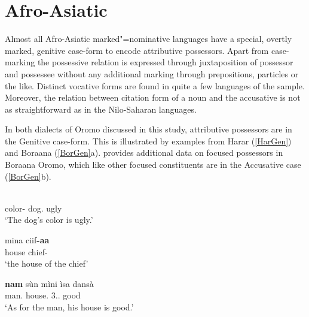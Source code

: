 \section{Afro-Asiatic}\label{ExtraAfro}

Almost all Afro-Asiatic marked"=nominative languages have a special, overtly marked, genitive case-form to encode attributive possessors.
Apart from case-marking the possessive relation is expressed through juxtaposition of possessor and possessee without any additional marking through prepositions, particles or the like. 
Distinct vocative forms are found in quite a few languages of the sample. 
Moreover, the relation between citation form of a noun and the accusative is not as straightforward as in the Nilo-Saharan languages.


In both dialects of Oromo discussed in this study, attributive possessors are in the Genitive case-form. 
This is illustrated by examples from Harar (\ref{HarGen}) and Boraana (\ref{BorGen}a). 
\citet[50]{Owens:1982} provides additional data on focused possessors in Boraana Oromo, which like other focused constituents are in the Accusative case (\ref{BorGen}b). 


\begin{exe}\ex\label{HarGen}
\gll{} \textbf{} \\
color-\nom{} dog.\gen{} ugly\\
\glt `The dog's color is ugly.'
\end{exe}

\begin{exe}\ex\label{BorGen}
\begin{xlist}
\ex\gll mina ciif\textbf{-aa}\\
house chief-\gen{}\\
\glt `the house of the chief'

\ex\gll \textbf{nam} s\`un m\`ini \`isa dans\`a\\
man.\acc{} \dem{} house.\acc{} 3\sg{}.\mas{}.\poss{} good\\
\glt `As for the man, his house is good.' %
\end{xlist}
\end{exe} 

